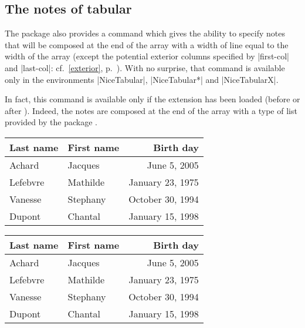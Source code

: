 \documentclass[dvipsnames]{article}%
\begin{document}
\subsection{The notes of tabular}



The package  also provides a command
 which gives the ability to specify notes that
will be composed at the end of the array with a width of line equal to the width
of the array (except the potential exterior columns specified by |first-col| and
|last-col|: cf.~\ref{exterior}, p.~\pageref{exterior}). With no surprise, that
command is available only in the environments |{NiceTabular}|, |{NiceTabular*}|
and |{NiceTabularX}|. 

In fact, this command is available only if the extension 
 has
been loaded (before or after ). Indeed, the notes are composed
at the end of the array with a type of list provided by the package
. 



\begin{Code}
\begin{NiceTabular}{@{}llr@{}}
\toprule \RowStyle{\bfseries}
Last name & First name & Birth day \\
\midrule
Achard\emph{}
& Jacques & June 5, 2005 \\
Lefebvre\emph{} 
& Mathilde & January 23, 1975 \\
Vanesse & Stephany & October 30, 1994 \\
Dupont & Chantal & January 15, 1998 \\
\bottomrule
\end{NiceTabular}
\end{Code}


\begin{center}
\begin{NiceTabular}{@{}llr@{}}
\toprule \RowStyle{\bfseries}
Last name & First name & Birth day \\
\midrule
Achard 
& Jacques & June 5, 2005 \\
Lefebvre 
& Mathilde & January 23, 1975 \\
Vanesse & Stephany & October 30, 1994 \\
Dupont & Chantal & January 15, 1998 \\
\bottomrule
\end{NiceTabular}
\end{center}
\end{document}
